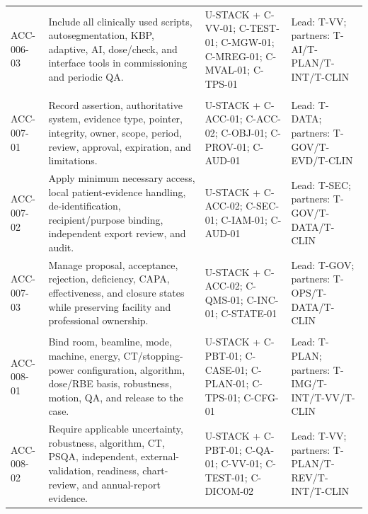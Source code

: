 \documentclass[11pt,letterpaper]{article}
\begin{document}
\begin{scriptsize}
\begin{longtable}{@{}L{0.14\textwidth}L{0.39\textwidth}L{0.25\textwidth}L{0.16\textwidth}@{}}
\addlinespace[2pt]
\mbox{ACC-006-03} & Include all clinically used scripts, autosegmentation, KBP, adaptive, AI, dose/check, and interface tools in commissioning and periodic QA. & U-STACK + C-VV-01; C-TEST-01; C-MGW-01; C-MREG-01; C-MVAL-01; C-TPS-01 & Lead: T-VV; partners: T-AI\slash\allowbreak{}T-PLAN\slash\allowbreak{}T-INT\slash\allowbreak{}T-CLIN \\
\addlinespace[2pt]
 \\
\addlinespace[2pt]
\mbox{ACC-007-01} & Record assertion, authoritative system, evidence type, pointer, integrity, owner, scope, period, review, approval, expiration, and limitations. & U-STACK + C-ACC-01; C-ACC-02; C-OBJ-01; C-PROV-01; C-AUD-01 & Lead: T-DATA; partners: T-GOV\slash\allowbreak{}T-EVD\slash\allowbreak{}T-CLIN \\
\addlinespace[2pt]
\mbox{ACC-007-02} & Apply minimum necessary access, local patient-evidence handling, de-identification, recipient/purpose binding, independent export review, and audit. & U-STACK + C-ACC-02; C-SEC-01; C-IAM-01; C-AUD-01 & Lead: T-SEC; partners: T-GOV\slash\allowbreak{}T-DATA\slash\allowbreak{}T-CLIN \\
\addlinespace[2pt]
\mbox{ACC-007-03} & Manage proposal, acceptance, rejection, deficiency, CAPA, effectiveness, and closure states while preserving facility and professional ownership. & U-STACK + C-ACC-02; C-QMS-01; C-INC-01; C-STATE-01 & Lead: T-GOV; partners: T-OPS\slash\allowbreak{}T-DATA\slash\allowbreak{}T-CLIN \\
\addlinespace[2pt]
 \\
\addlinespace[2pt]
\mbox{ACC-008-01} & Bind room, beamline, mode, machine, energy, CT/stopping-power configuration, algorithm, dose/RBE basis, robustness, motion, QA, and release to the case. & U-STACK + C-PBT-01; C-CASE-01; C-PLAN-01; C-TPS-01; C-CFG-01 & Lead: T-PLAN; partners: T-IMG\slash\allowbreak{}T-INT\slash\allowbreak{}T-VV\slash\allowbreak{}T-CLIN \\
\addlinespace[2pt]
\mbox{ACC-008-02} & Require applicable uncertainty, robustness, algorithm, CT, PSQA, independent, external-validation, readiness, chart-review, and annual-report evidence. & U-STACK + C-PBT-01; C-QA-01; C-VV-01; C-TEST-01; C-DICOM-02 & Lead: T-VV; partners: T-PLAN\slash\allowbreak{}T-REV\slash\allowbreak{}T-INT\slash\allowbreak{}T-CLIN \\

\end{longtable}
\end{scriptsize}
\end{document}
